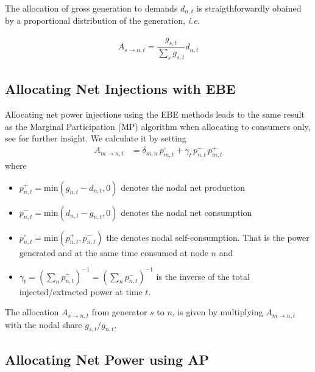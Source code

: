 \documentclass[11pt,twocolumn]{article}
\newcommand{\ie}{\textit{i.e.} }
\newcommand{\generation}{g_{s,t}}
\newcommand{\nodalgeneration}[1][n]{g_{#1,t}}
\newcommand{\demand}[1][n]{d_{#1,t}}
\newcommand{\nodaldemand}[1][n]{d_{#1,t}}
\newcommand{\injection}{p_{n,t}}
\newcommand{\netconsumption}[1][n]{p^{-}_{#1,t}}
\newcommand{\netproduction}[1][n]{p^{+}_{#1,t}}
\newcommand{\selfconsumption}[1][n]{p^{\circ}_{#1,t}}
\newcommand{\allocatepeer}[1][s \rightarrow n]{A_{#1,t}}
\begin{document}
The allocation of gross generation to demands $\demand$ is straigthforwardly obained by a proportional distribution of the generation, \ie

\begin{align}
    \allocatepeer[s \rightarrow n] = \dfrac{\generation}{\sum_s \generation} \demand 
\end{align}


\subsection{Allocating Net Injections with EBE}
\label{sec:net_ebe}

Allocating net power injections using the EBE methods leads to the same result as the Marginal Participation (MP) \cite{rudnick_marginal_1995}  algorithm when allocating to consumers only, see \cite{hofmann_flow_2020-1} for further insight. We calculate it by setting 
\begin{align}
\allocatepeer[m \rightarrow n] &=  \delta_{m,n}\,\selfconsumption[m] + \gamma_t \, \netconsumption  \, \netproduction[m]
\label{eq:mp_slack}
\end{align}
where 
\begin{itemize}
\item $\netproduction = \text{min}\left( \nodalgeneration - \nodaldemand , 0 \right) $ denotes the nodal net production 
\item $\netconsumption = \text{min}\left( \nodaldemand  - \nodalgeneration, 0 \right)$ denotes the nodal net consumption
\item $\selfconsumption = \text{min}\left( \netproduction, \netconsumption \right)$ the denotes  nodal self-consumption. That is the power generated and at the same time consumed at node $n$ and 
\item $\gamma_t = \left( \sum_n \netproduction\right) ^{-1} = \left( \sum_n \netconsumption\right) ^{-1}$ is the inverse of the total injected/extracted power at time $t$.
\end{itemize}

The allocation $\allocatepeer$ from generator $s$ to $n$, is given by multiplying $\allocatepeer[m \rightarrow n]$ with the nodal share $\generation / \nodalgeneration$.


\subsection{Allocating Net Power using AP}
\label{sec:net_ap}
\end{document}

